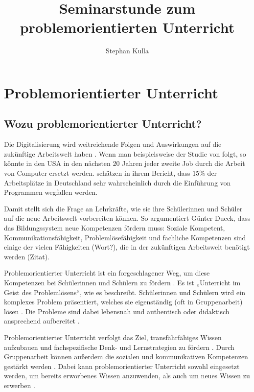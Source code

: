 \documentclass[man,12pt,a4paper]{apa6}
\title{Seminarstunde zum problemorientierten Unterricht}
\author{Stephan Kulla}
\affiliation{TU München}
\begin{document}
\maketitle

\section{Problemorientierter Unterricht}

\subsection{Wozu problemorientierter Unterricht?}

Die Digitalisierung wird weitreichende Folgen und Auswirkungen auf die zukünftige Arbeitswelt haben \parencite{dengler2015}. Wenn man beispielsweise der Studie von \textcite{frey2017} folgt, so könnte in den USA in den nächsten 20 Jahren jeder zweite Job durch die Arbeit von Computer ersetzt werden. \textcite{dengler2015} schätzen in ihrem Bericht, dass $15\%$ der Arbeitsplätze in Deutschland sehr wahrscheinlich durch die Einführung von Programmen wegfallen werden.

Damit stellt sich die Frage an Lehrkräfte, wie sie ihre Schülerinnen und Schüler auf die neue Arbeitswelt vorbereiten können. So argumentiert Günter Dueck, dass das Bildungssystem neue Kompetenzen fördern muss: Soziale Kompetent, Kommunikationsfähigkeit, Problemlösefähigkeit und fachliche Kompetenzen sind einige der vielen Fähigkeiten (Wort?), die in der zukünftigen Arbeitswelt benötigt werden (Zitat).

Problemorientierter Unterricht ist ein forgeschlagener Weg, um diese Kompetenzen bei Schülerinnen und Schülern zu fördern \parencite{silver2004}. Es ist „Unterricht im Geist des Problemlösens“, wie \textcite{reusser2005} es beschreibt. Schülerinnen und Schülern wird ein komplexes Problem präsentiert, welches sie eigenständig (oft in Gruppenarbeit) lösen \parencite{silver2004}. Die Probleme sind dabei lebensnah und authentisch \parencite{kunter2013} oder didaktisch ansprechend aufbereitet \parencite{reusser2005}.

Problemorientierter Unterricht verfolgt das Ziel, transfährfähiges Wissen aufzubauen und fachspezifische Denk- und Lernstrategien zu fördern \parencite{reusser2005}. Durch Gruppenarbeit können außerdem die sozialen und kommunikativen Kompetenzen gestärkt werden \parencite{seidel2014}. Dabei kann problemorientierter Unterricht sowohl eingesetzt werden, um bereits erworbenes Wissen anzuwenden, als auch um neues Wissen zu erwerben \parencite{reusser2005}.
\end{document}
